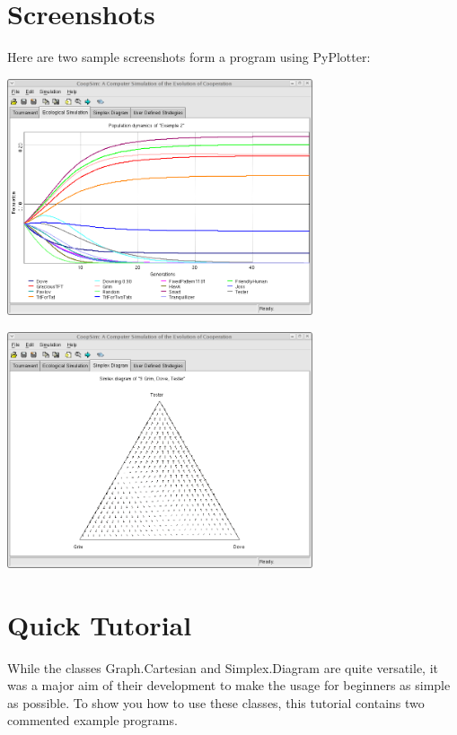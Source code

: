 \documentclass[12pt,a4paper,USenglish]{article}
\begin{document}
\newpage

\section{Screenshots}

Here are two sample screenshots form a program using PyPlotter:

\begin{center}
\includegraphics[width=9cm,keepaspectratio]{screenshots/coopsim_eco.png}
\end{center}

\begin{center}
\includegraphics[width=9cm,keepaspectratio]{screenshots/coopsim_simplex.png}
\end{center}

\section{Quick Tutorial}

While the classes Graph.Cartesian and Simplex.Diagram are quite
versatile, it was a major aim of their development to make the usage
for beginners as simple as possible. To show you how to use these
classes, this tutorial contains two commented example programs.
\end{document}
